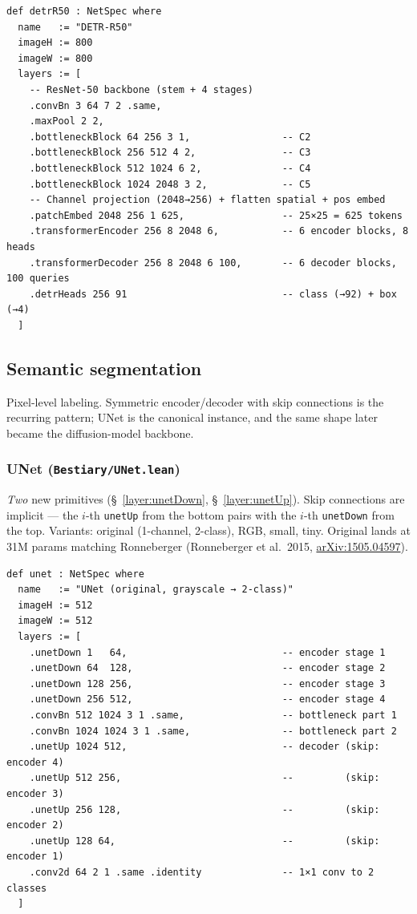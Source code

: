 \begin{verbatim}
def detrR50 : NetSpec where
  name   := "DETR-R50"
  imageH := 800
  imageW := 800
  layers := [
    -- ResNet-50 backbone (stem + 4 stages)
    .convBn 3 64 7 2 .same,
    .maxPool 2 2,
    .bottleneckBlock 64 256 3 1,                -- C2
    .bottleneckBlock 256 512 4 2,               -- C3
    .bottleneckBlock 512 1024 6 2,              -- C4
    .bottleneckBlock 1024 2048 3 2,             -- C5
    -- Channel projection (2048→256) + flatten spatial + pos embed
    .patchEmbed 2048 256 1 625,                 -- 25×25 = 625 tokens
    .transformerEncoder 256 8 2048 6,           -- 6 encoder blocks, 8 heads
    .transformerDecoder 256 8 2048 6 100,       -- 6 decoder blocks, 100 queries
    .detrHeads 256 91                           -- class (→92) + box (→4)
  ]
\end{verbatim}

\subsection{Semantic segmentation}

Pixel-level labeling. Symmetric encoder/decoder with skip connections
is the recurring pattern; UNet is the canonical instance, and the same
shape later became the diffusion-model backbone.

\subsubsection*{UNet (\texttt{Bestiary/UNet.lean})}
\emph{Two} new primitives (\S~\ref{layer:unetDown},
\S~\ref{layer:unetUp}). Skip connections are implicit --- the $i$-th \texttt{unetUp} from the bottom
pairs with the $i$-th \texttt{unetDown} from the top. Variants:
original (1-channel, 2-class), RGB, small, tiny. Original lands at 31M
params matching Ronneberger (Ronneberger et al.\ 2015,
\href{https://arxiv.org/abs/1505.04597}{arXiv:1505.04597}).

\begin{verbatim}
def unet : NetSpec where
  name   := "UNet (original, grayscale → 2-class)"
  imageH := 512
  imageW := 512
  layers := [
    .unetDown 1   64,                           -- encoder stage 1
    .unetDown 64  128,                          -- encoder stage 2
    .unetDown 128 256,                          -- encoder stage 3
    .unetDown 256 512,                          -- encoder stage 4
    .convBn 512 1024 3 1 .same,                 -- bottleneck part 1
    .convBn 1024 1024 3 1 .same,                -- bottleneck part 2
    .unetUp 1024 512,                           -- decoder (skip: encoder 4)
    .unetUp 512 256,                            --         (skip: encoder 3)
    .unetUp 256 128,                            --         (skip: encoder 2)
    .unetUp 128 64,                             --         (skip: encoder 1)
    .conv2d 64 2 1 .same .identity              -- 1×1 conv to 2 classes
  ]
\end{verbatim}

